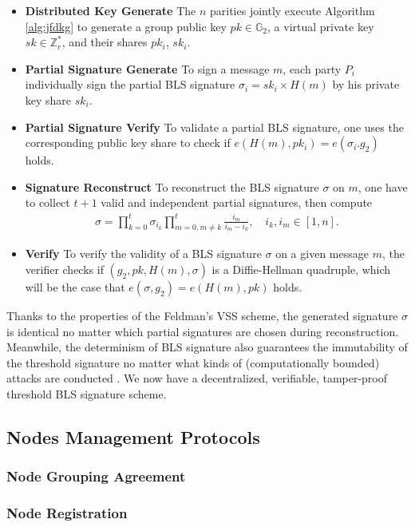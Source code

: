 \documentclass[11pt]{article}
\begin{document}
\begin{itemize}
    \item[] \textbf{Distributed Key Generate} The $n$ parities jointly execute Algorithm \ref{alg:jfdkg} to generate a group public key $pk \in \mathbb{G}_2$, a virtual private key $sk \in \mathbb{Z}_r^*$, and their shares $pk_i$, $sk_i$.
    \item[] \textbf{Partial Signature Generate} To sign a message $m$, each party $P_i$ individually sign the partial BLS signature $\sigma_i=sk_i \times H(m)$ by his private key share $sk_i$.
    \item[] \textbf{Partial Signature Verify} To validate a partial BLS signature, one uses the corresponding public key share to check if $e(H(m),pk_i)=e(\sigma_i.g_2)$ holds.
    \item[] \textbf{Signature Reconstruct} To reconstruct the BLS signature $\sigma$ on $m$, one have to collect $t+1$ valid and independent partial signatures, then compute
    \begin{align*}
        \sigma = \prod_{k=0}^t \sigma_{i_k} \prod_{m=0, m\neq k}^t \frac{i_m}{i_m-i_k},\quad i_k, i_m \in [1,n].
    \end{align*}
    \item[] \textbf{Verify} To verify the validity of a BLS signature $\sigma$ on a given message $m$, the verifier checks if $(g_2,pk,H(m),\sigma)$ is a Diffie-Hellman quadruple, which will be the case that $e(\sigma,g_2)=e(H(m),pk)$ holds.
\end{itemize}

Thanks to the properties of the Feldman's VSS scheme, the generated signature $\sigma$ is identical no matter which partial signatures are chosen during reconstruction. Meanwhile, the determinism of BLS signature also guarantees the immutability of the threshold signature no matter what kinds of (computationally bounded) attacks are conducted . We now have a decentralized, verifiable, tamper-proof threshold BLS signature scheme.

\subsection{Nodes Management Protocols}

\subsubsection{Node Grouping Agreement}

\subsubsection{Node Registration}
\end{document}
